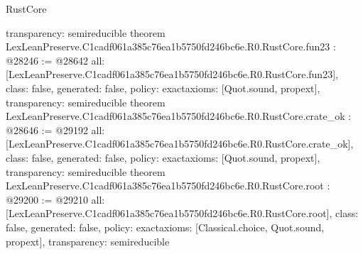 \begin{lexlean}{RustCore}
\begin{coremodule}
{  transparency: semireducible
}
theorem LexLeanPreserve.C1cadf061a385c76ea1b5750fd246bc6e.R0.RustCore.fun23 : @28246 := @28642 {
  all: [LexLeanPreserve.C1cadf061a385c76ea1b5750fd246bc6e.R0.RustCore.fun23],
  class: false,
  generated: false,
  policy: exact{axioms: [Quot.sound, propext]},
  transparency: semireducible
}
theorem LexLeanPreserve.C1cadf061a385c76ea1b5750fd246bc6e.R0.RustCore.crate_ok : @28646 := @29192 {
  all: [LexLeanPreserve.C1cadf061a385c76ea1b5750fd246bc6e.R0.RustCore.crate_ok],
  class: false,
  generated: false,
  policy: exact{axioms: [Quot.sound, propext]},
  transparency: semireducible
}
theorem LexLeanPreserve.C1cadf061a385c76ea1b5750fd246bc6e.R0.RustCore.root : @29200 := @29210 {
  all: [LexLeanPreserve.C1cadf061a385c76ea1b5750fd246bc6e.R0.RustCore.root],
  class: false,
  generated: false,
  policy: exact{axioms: [Classical.choice, Quot.sound, propext]},
  transparency: semireducible
}


\end{coremodule}
\end{lexlean}
